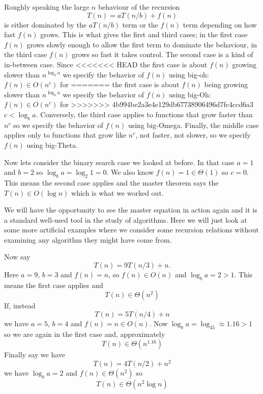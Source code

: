\documentclass[11pt,a4paper]{scrartcl}
\begin{document}
Roughly speaking the large $n$ behaviour of the recursion
\begin{equation}
T(n)=aT(n/b)+f(n)
\end{equation}
is either dominated by the $aT(n/b)$ term or the $f(n)$ term depending
on how fast $f(n)$ grows. This is what gives the first and third
cases; in the first case $f(n)$ grows slowly enough to allow the first
term to dominate the behaviour, in the third case $f(n)$ grows so fast
it takes control. The second case is a kind of in-between case. Since
<<<<<<< HEAD
the first case is about $f(n)$ growing slower than $n^{\log_ba}$
we specify the behavior of $f(n)$ using big-oh: $f(n)\in O(n^c)$ for
=======
the first case is about $f(n)$ being growing slower than $n^{\log_ba}$
we specify the behavior of $f(n)$ using big-Oh: $f(n)\in O(n^c)$ for
>>>>>>> 4b994be2a3e4e129db67738906496d7fc4ccd6a3
$c<\log_ba$. Conversely, the third case applies to functions that grow
faster than $n^c$ so we specify the behavior of $f(n)$ using
big-Omega. Finally, the middle case applies only to functions that
grow like $n^c$, not faster, not slower, so we specify $f(n)$ using big-Theta.

Now lets consider the binary search case we looked at before. In that case
$a=1$ and $b=2$ so $\log_ba=\log_2 1=0$. We also know $f(n)=1\in \Theta(1)$
so $c=0$. This means the second case applies and the master theorem
says the $T(n)\in O(\log n)$ which is what we worked out.

We will have the opportunity to see the master equation in action
again and it is a standard well-used tool in the study of
algorithms. Here we will just look at some more artificial examples
where we consider some recursion relations without examining any
algorithm they might have come from. 

Now say
\begin{equation}
T(n)=9T(n/3)+n.
\end{equation}
Here $a=9$, $b=3$ and $f(n)=n$, so $f(n)\in O(n)$ and $\log_ba=2>1$. This means the first case applies and
\begin{equation}
T(n)\in \Theta(n^2)
\end{equation}
If, instead
\begin{equation}
T(n)=5T(n/4)+n
\end{equation}
we have $a=5$, $b=4$ and $f(n)=n\in O(n)$. Now $\log_ba=\log_45\approx 1.16>1$ so we are again in the first case and, approximately 
\begin{equation}
T(n)\in \Theta(n^{1.16})
\end{equation}
Finally say we have
\begin{equation}
T(n)=4T(n/2)+n^2
\end{equation}
we have $\log_ba=2$ and $f(n)\in \Theta(n^2)$ so
\begin{equation}
T(n)\in \Theta(n^2\log n)
\end{equation}
\end{document}

